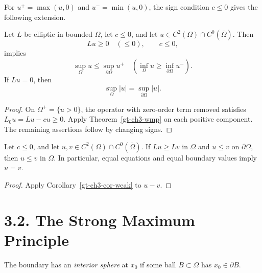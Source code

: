 For $u^+=\max(u,0)$ and $u^-=\min(u,0)$, the sign condition $c\leq0$
gives the following extension.

\begin{corollary}\label{gt-ch3-cor-weak}
Let $L$ be elliptic in bounded $\Omega$, let $c\leq0$, and let
$u\in C^2(\Omega)\cap C^0(\overline\Omega)$. Then
\begin{equation}
\tag{3.7}
Lu\geq0\quad(\leq0),\qquad c\leq0,
\end{equation}
implies
\begin{equation}
\tag{3.8}
\sup_\Omega u\leq\sup_{\partial\Omega}u^+
\quad\left(\inf_\Omega u\geq\inf_{\partial\Omega}u^-\right).
\end{equation}
If $Lu=0$, then
\begin{equation}
\tag{3.9}
\sup_\Omega|u|=\sup_{\partial\Omega}|u|.
\end{equation}
\end{corollary}
\begin{proof}
\sketch On $\Omega^+=\{u>0\}$, the operator with zero-order term removed
satisfies $L_0u=Lu-cu\geq0$. Apply Theorem~\ref{gt-ch3-wmp} on each
positive component. The remaining assertions follow by changing signs.
\end{proof}

\begin{theorem}\label{gt-ch3-comparison}
Let $c\leq0$, and let $u,v\in C^2(\Omega)\cap C^0(\overline\Omega)$. If
$Lu\geq Lv$ in $\Omega$ and $u\leq v$ on $\partial\Omega$, then $u\leq v$
in $\Omega$. In particular, equal equations and equal boundary values imply
$u=v$.
\end{theorem}
\begin{proof}
\sketch Apply Corollary~\ref{gt-ch3-cor-weak} to $u-v$.
\end{proof}

\section*{3.2. The Strong Maximum Principle}

The boundary has an \emph{interior sphere} at $x_0$ if some ball
$B\subset\Omega$ has $x_0\in\partial B$.

